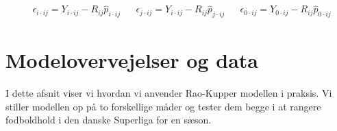 \documentclass[11pt,a4paper]{article}
\begin{document}
\begin{align*}
&\epsilon_{i\cdot ij}=Y_{i\cdot ij}-R_{ij}\hat{p}_{i\cdot ij}
&&\epsilon_{j\cdot ij}=Y_{i\cdot ij}-R_{ij} \hat{p}_{j\cdot ij}
&&\epsilon_{0\cdot ij}=Y_{0\cdot ij}-R_{ij} \hat{p}_{0\cdot ij}
\end{align*}
\section{Modelovervejelser og data}
I dette afsnit viser vi hvordan vi anvender Rao-Kupper modellen i praksis. Vi stiller modellen op på to forskellige måder og tester dem begge i at rangere fodboldhold i den danske Superliga for en sæson. 
\end{document}
